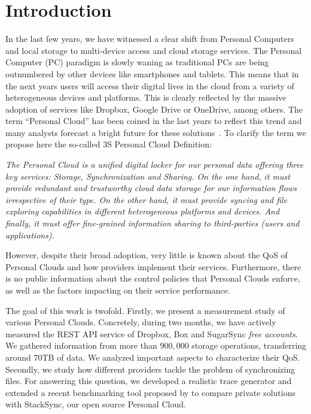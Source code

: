 \chapter{Introduction}

In the last few years, we have witnessed a clear shift from Personal Computers and local storage to multi-device access and cloud storage services. The Personal Computer (PC) paradigm is slowly waning as traditional PCs are being outnumbered by other devices like smartphones and tablets. This means that in the next years  users will access their digital lives in the cloud from a variety of heterogeneous devices and platforms. This is clearly reflected by the massive adoption of services like Dropbox, Google Drive or OneDrive, among others.  The term ``Personal Cloud'' has been coined in the last years to reflect this trend and many analysts forecast  a bright future for these solutions~\cite{forrester}\cite{gartner}. To clarify the term we propose here the so-called 3S Personal Cloud Definition:

\textit{The Personal Cloud is a unified digital  locker for our personal data offering three key services: Storage, Synchronization and Sharing.  On the one hand, it must provide redundant and trustworthy cloud data storage for our information flows irrespective of their type. On the other hand, it must provide syncing and file exploring capabilities in different heterogeneous platforms and devices. And finally, it must offer fine-grained information sharing to third-parties (users and applications).}

However, despite their broad adoption, very little is known
about the QoS of Personal Clouds and how providers implement their services. Furthermore,
there is no public information about the control policies that
Personal Clouds enforce, as well as the factors
impacting on their service performance.

The goal of this work is twofold. Firstly, we present a measurement study of various Personal Clouds.
Concretely, during two months, we have actively measured the REST API service of Dropbox, Box and SugarSync
\textit{free accounts}. We gathered information from more than $900,000$ storage operations, transferring
around $70$TB of data. We analyzed important aspects to characterize their QoS.
Secondly, we study how different providers tackle the problem of synchronizing files. For answering
this question, we developed a realistic trace generator and extended a recent benchmarking tool proposed by
\cite{drago2013benchmarking} to compare private solutions with StackSync, our open source Personal Cloud.


